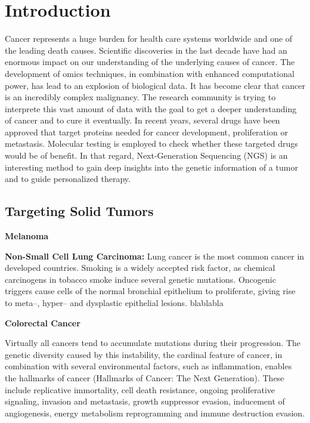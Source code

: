 \section{Introduction}

  Cancer represents a huge burden for health care systems worldwide and one of
  the leading death causes. Scientific discoveries in the last decade have had
  an enormous impact on our understanding of the underlying causes of cancer.
  The development of omics techniques, in combination with enhanced
  computational power, has lead to an explosion of biological data. It has
  become clear that cancer is an incredibly complex malignancy. The research
  community is trying to interprete this vast amount of data with the goal to
  get a deeper understanding of cancer and to cure it eventually. In recent
  years, several drugs have been approved that target proteins needed for cancer
  development, proliferation or metastasis. Molecular testing is employed to
  check whether these targeted drugs would be of benefit. In that regard,
  Next-Generation Sequencing (NGS) is an interesting method to gain deep
  insights into the genetic information of a tumor and to guide personalized
  therapy.

  \subsection{Targeting Solid Tumors}

    \textbf{Melanoma}


    \textbf{Non-Small Cell Lung Carcinoma:} Lung cancer is the most common
    cancer in developed countries. Smoking is a widely accepted risk factor, as
    chemical carcinogens in tobacco smoke induce several genetic mutations.
    Oncogenic triggers cause cells of the normal bronchial epithelium to
    proliferate, giving rise to meta--, hyper-- and dysplastic epithelial
    lesions. blablabla


    \textbf{Colorectal Cancer}


    Virtually all cancers tend to accumulate mutations during their progression.
    The genetic diversity caused by this instability, the cardinal feature of
    cancer, in combination with several environmental factors, such as
    inflammation, enables the hallmarks of cancer (Hallmarks of Cancer: The Next
    Generation). These include replicative immortality, cell death resistance,
    ongoing proliferative signaling, invasion and metastasis, growth suppressor
    evasion, inducement of angiogenesis, energy metabolism reprogramming and
    immune destruction evasion.

